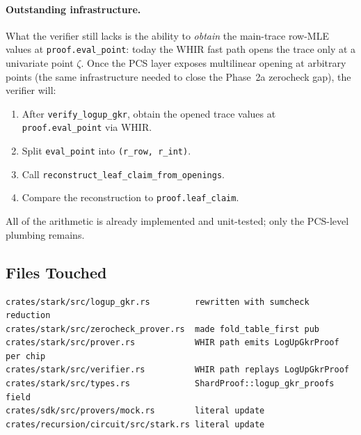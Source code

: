 \paragraph{Outstanding infrastructure.} What the verifier still lacks is
the ability to \emph{obtain} the main-trace row-MLE values at
\texttt{proof.eval\_point}: today the WHIR fast path opens the trace
only at a univariate point $\zeta$.  Once the PCS layer exposes
multilinear opening at arbitrary points (the same infrastructure needed
to close the Phase~2a zerocheck gap), the verifier will:
\begin{enumerate}
  \item After \texttt{verify\_logup\_gkr}, obtain the opened trace
        values at \texttt{proof.eval\_point} via WHIR.
  \item Split \texttt{eval\_point} into \texttt{(r\_row, r\_int)}.
  \item Call \texttt{reconstruct\_leaf\_claim\_from\_openings}.
  \item Compare the reconstruction to \texttt{proof.leaf\_claim}.
\end{enumerate}
All of the arithmetic is already implemented and unit-tested; only the
PCS-level plumbing remains.

\subsection{Files Touched}

\begin{verbatim}
crates/stark/src/logup_gkr.rs         rewritten with sumcheck reduction
crates/stark/src/zerocheck_prover.rs  made fold_table_first pub
crates/stark/src/prover.rs            WHIR path emits LogUpGkrProof per chip
crates/stark/src/verifier.rs          WHIR path replays LogUpGkrProof
crates/stark/src/types.rs             ShardProof::logup_gkr_proofs field
crates/sdk/src/provers/mock.rs        literal update
crates/recursion/circuit/src/stark.rs literal update
\end{verbatim}
